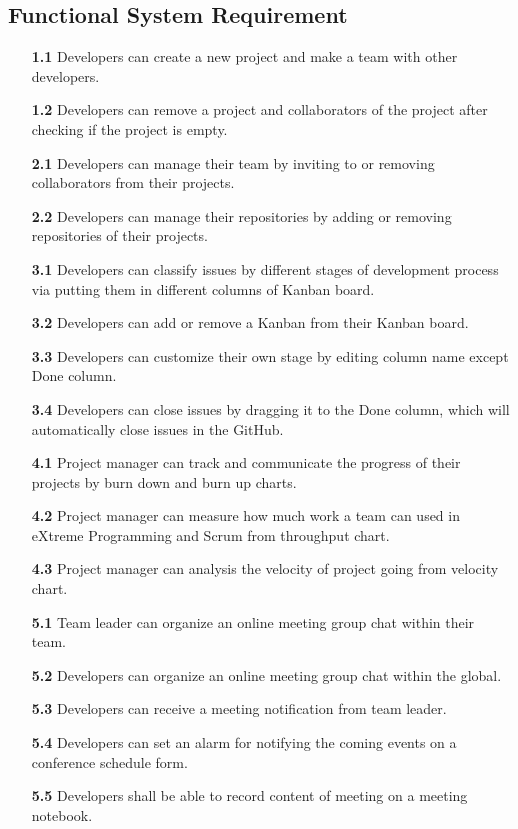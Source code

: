 \documentclass[12pt,a4paper]{report}
\begin{document}
	\subsection{Functional System Requirement}
		\begin{enumerate}
			\item[\textbf{1.1}] Developers can create a new project and make a team with other developers.
			\item[\textbf{1.2}] Developers can remove a project and collaborators of the project after checking if the project is empty.
			\item[\textbf{2.1}] Developers can manage their team by inviting to or removing collaborators from their projects.
			\item[\textbf{2.2}] Developers can manage their repositories by adding or removing repositories of their projects.
			\item[\textbf{3.1}] Developers can classify issues by different stages of development process via putting them in different columns of Kanban board. 
			\item[\textbf{3.2}] Developers can add or remove a Kanban from their Kanban board.
			\item[\textbf{3.3}] Developers can customize their own stage by editing column name except Done column.
			\item[\textbf{3.4}]	Developers can close issues by dragging it to the Done column, which will automatically close issues in the GitHub. 
			\item[\textbf{4.1}] Project manager can track and communicate the progress of their projects by burn down and burn up charts.
			\item[\textbf{4.2}] Project manager can measure how much work a team can used in eXtreme Programming and Scrum from throughput chart.
			\item[\textbf{4.3}] Project manager can analysis the velocity of project going from velocity chart.
			\item[\textbf{5.1}] Team leader can organize an online meeting group chat within their team.
			\item[\textbf{5.2}] Developers can organize an online meeting group chat within the global.
			\item[\textbf{5.3}] Developers can receive a meeting notification from team leader.
			\item[\textbf{5.4}] Developers can set an alarm for notifying the coming events on a conference schedule form.
			\item[\textbf{5.5}] Developers shall be able to record content of meeting on a meeting notebook.
		\end{enumerate}
\end{document}
